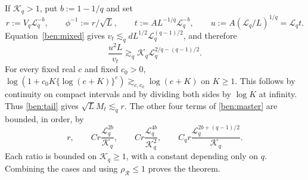 \documentclass[11pt,letterpaper]{article}
\theoremstyle{remark}
\newcommand{\rh}{\rho_{\mathcal R}}
\begin{document}
If \(\mathcal K_q>1\), put \(b:=1-1/q\) and set
\[
 r:=V_q \mathcal{L}_q^{-b},\qquad \phi^{-1}:=r/\sqrt L,\qquad
 t:=AL^{-1/q}\mathcal{L}_q^{-b},\qquad u:=A(\mathcal{L}_q/L)^{1/q}=\mathcal{L}_q t.
\]
Equation~\eqref{ben:mixed} gives
\(v_t\lesssim_q dL^{1/2}\mathcal{L}_q^{(q-1)/2}\), and therefore
\[
 \frac{u^2L}{v_t}\gtrsim_q
 \mathcal K_q \mathcal{L}_q^{2/q-(q-1)/2}.
\]
For every fixed real \(c\) and fixed \(c_0>0\),
\(\log(1+c_0K\{\log(e+K)\}^c)\gtrsim_{c,c_0}\log(e+K)\)
on \(K\ge1\). This follows by continuity on compact intervals and
by dividing both sides by \(\log K\) at infinity. Thus
\eqref{ben:tail} gives \(\sqrt L M_t\lesssim_q r\).
The other four terms of \eqref{ben:master} are bounded, in order, by
\[
 r,\qquad C r\frac{\mathcal{L}_q^{2b}}{\mathcal K_q},\qquad
 C r\frac{\mathcal{L}_q^{4b}}{\mathcal K_q^2},\qquad
 C_q r\frac{\mathcal{L}_q^{2b+(q-1)/2}}{\mathcal K_q}.
\]
Each ratio is bounded on \(\mathcal K_q\ge1\), with a constant depending only
on \(q\). Combining the cases and using \(\rh\le1\) proves the
theorem.
\end{document}
